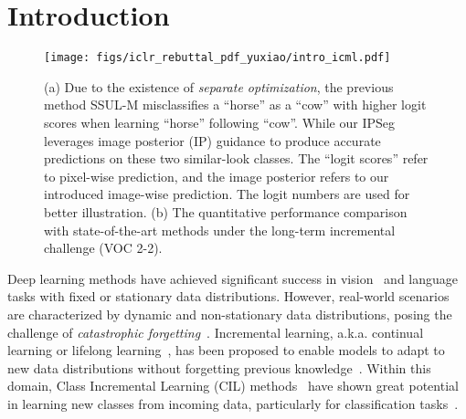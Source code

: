 \section{Introduction}
\label{sec:Introduction}

\begin{figure*}[ht]
    \centering
    \texttt{[image: figs/iclr\_rebuttal\_pdf\_yuxiao/intro\_icml.pdf]}
    \vspace{-10pt}
    \caption{(a) Due to the existence of \textit{separate optimization}, the previous method SSUL-M misclassifies a ``horse'' as a ``cow'' with higher logit scores when learning ``horse'' following ``cow''. 
    While our IPSeg leverages image posterior (IP) guidance to produce accurate predictions on these two similar-look classes.
    The ``logit scores'' refer to pixel-wise prediction, and the image posterior refers to our introduced image-wise prediction.
    The logit numbers are used for better illustration.
    (b) The quantitative performance comparison with state-of-the-art methods under the long-term incremental challenge (VOC 2-2).}
    \label{fig:vis_intro}
\end{figure*}

Deep learning methods have achieved significant success in vision~\citep{Cl_in_cv_qu2021recent} and language~\citep{CL_in_NLP_ke2022continual} tasks with fixed or stationary data distributions. However, real-world scenarios are characterized by dynamic and non-stationary data distributions, posing the challenge of \textit{catastrophic forgetting}~\citep{CF_mccloskey1989catastrophic, mcclelland1995there}. Incremental learning, a.k.a. continual learning or lifelong learning~\citep{lifelong_silver2013lifelong}, has been proposed to enable models to adapt to new data distributions without forgetting previous knowledge~\citep{lifelong2_kudithipudi2022biological}. Within this domain, Class Incremental Learning (CIL) methods~\citep{CIL_archi_serra2018overcoming, lwf_li2017learning, iCaRL_rebuffi2017icarl, OCIL_survey_mai2022online, wang2024hierarchical} have shown great potential in learning new classes from incoming data, particularly for classification tasks~\citep{CL_in_classification_de2021continual}.

